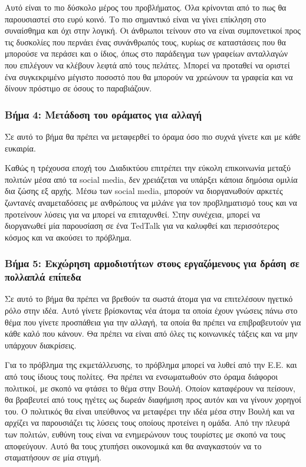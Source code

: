 Αυτό είναι το πιο δύσκολο μέρος του προβλήματος. Όλα κρίνονται από το πως θα παρουσιαστεί στο ευρύ κοινό. Το πιο σημαντικό είναι να γίνει επίκληση στο συναίσθημα και όχι στην λογική. Οι άνθρωποι τείνουν στο να είναι συμπονετικοί προς τις δυσκολίες που περνάει ένας συνάνθρωπός τους, κυρίως σε καταστάσεις που θα μπορούσε να περάσει και ο ίδιος, όπως στο παράδειγμα των γραφείων ανταλλαγών που επιλέγουν να κλέβουν λεφτά από τους πελάτες. Μπορεί να προταθεί να οριστεί ένα συγκεκριμένο μέγιστο ποσοστό που θα μπορούν να χρεώνουν τα γραφεία και να δίνουν πρόστιμο σε όσους το παραβιάζουν.

\subsubsection{Βήμα 4: Μετάδοση του οράματος για αλλαγή}

\begin{problem}
  Σε αυτό το βήμα θα πρέπει να μεταφερθεί το όραμα όσο πιο συχνά γίνετε και με κάθε ευκαιρία.
\end{problem}

Καθώς η τρέχουσα εποχή του Διαδικτύου επιτρέπει την εύκολη επικοινωνία μεταξύ πολιτών μέσα από τα social media, δεν χρειάζεται να υπάρξει κάποια δημόσια ομιλία δια ζώσης εξ αρχής. Μέσω των social media, μπορούν να διοργανωθούν αρκετές ζωντανές αναμεταδόσεις με ανθρώπους να μιλάνε για τον προβληματισμό τους και να προτείνουν λύσεις για να μπορεί να επιταχυνθεί. Στην συνέχεια, μπορεί να διοργανωθεί μία παρουσίαση σε ένα TedTalk για να καλυφθεί και περισσότερος κόσμος και να ακούσει το πρόβλημα.

\subsubsection{Βήμα 5: Εκχώρηση αρμοδιοτήτων στους εργαζόμενους για δράση σε πολλαπλά επίπεδα}

\begin{problem}
  Σε αυτό το βήμα θα πρέπει να βρεθούν τα σωστά άτομα για να επιτελέσουν ηγετικό ρόλο στην ιδέα. Αυτό γίνετε βρίσκοντας νέα άτομα τα οποία έχουν γνώσεις πάνω στο θέμα που γίνετε προσπάθεια για την αλλαγή, τα οποία θα πρέπει να επιβραβευτούν για κάθε καλό που κάνουν. Θα πρέπει να είναι από όλες τις κοινωνικές τάξεις και να μην υπάρχουν διακρίσεις.
\end{problem}

Για το πρόβλημα της εκμετάλλευσης, το πρόβλημα μπορεί να λυθεί από την Ε.Ε. και από τους ίδιους τους πολίτες. Θα πρέπει να ενσωματωθούν στο όραμα διάφοροι πολιτικοί, με σκοπό να φτάσει το θέμα στην Βουλή. Οποίον καταφέρουν να πείσουν, θα βραβευτεί από τους ηγέτες ως δωρεάν διαφήμιση προς αυτόν και να γίνουν χορηγοί του. Ο πολιτικός θα είναι υπεύθυνος να μεταφέρει την ιδέα μέσα στην Βουλή και να αρχίζει να παρουσιάζει τις λύσεις τους οποίους προτείνει η ομάδα. Από την πλευρά των πολιτών, ευθύνη τους είναι να ενημερώνουν τους τουρίστες με σκοπό να τους αποφεύγουν. Αυτό θα τους χτυπήσει οικονομικά και θα αναγκαστούν να το σταματήσουν σε μία στιγμή.


